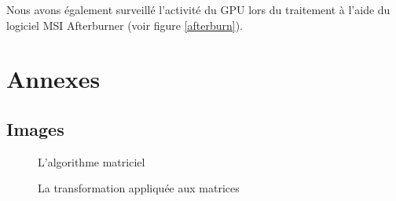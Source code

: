 \documentclass{article}
\begin{document}
Nous avons également surveillé l'activité du GPU lors du traitement à l'aide du logiciel MSI Afterburner (voir figure \ref{afterburn}).


\clearpage
\lstset{language=Python,frame=single,breaklines=true,extendedchars=true, numbers=left,basicstyle=\footnotesize}
\section{Annexes}

\subsection{Images}

\begin{figure}[!h]
\centering
\scalebox{0.8}{
}
\caption{L'algorithme matriciel}
\label{mat1}
\end{figure}


\begin{figure}[!h]
\centering
\scalebox{0.8}{
}
\caption{La transformation appliquée aux matrices}
\label{mat2}
\end{figure}
\end{document}

